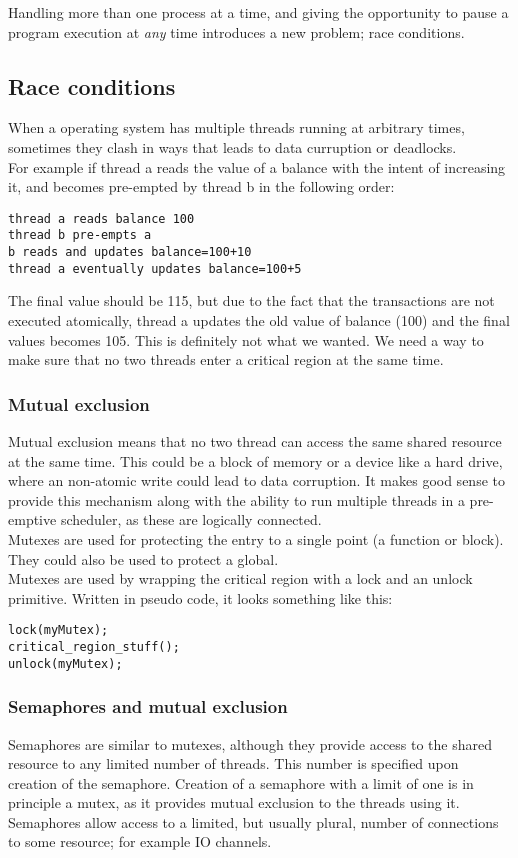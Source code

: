 Handling more than one process at a time, and giving the opportunity to pause a program execution at \emph{any} time introduces a new problem; race conditions.\\
\subsection{Race conditions}
When a operating system has multiple threads running at arbitrary times, sometimes they clash in ways that leads to data curruption or deadlocks.\\
For example if thread a reads the value of a balance with the intent of increasing it, and becomes pre-empted by thread b in the following order:
\begin{verbatim}
thread a reads balance 100
thread b pre-empts a
b reads and updates balance=100+10
thread a eventually updates balance=100+5
\end{verbatim}
The final value should be 115, but due to the fact that the transactions are not executed atomically, thread a updates the old value of balance (100) and the final values becomes 105. This is definitely not what we wanted. We need a way to make sure that no two threads enter a critical region at the same time.

\subsubsection{Mutual exclusion}
Mutual exclusion means that no two thread can access the same shared resource at the same time. This could be a block of memory or a device like a hard drive, where an non-atomic write could lead to data corruption. It makes good sense to provide this mechanism along with the ability to run multiple threads in a pre-emptive scheduler, as these are logically connected.\\
Mutexes are used for protecting the entry to a single point (a function or block). They could also be used to protect a global.\\
Mutexes are used by wrapping the critical region with a lock and an unlock primitive. Written in pseudo code, it looks something like this:
\begin{lstlisting}[basicstyle={\small}]
lock(myMutex);
critical_region_stuff();
unlock(myMutex);
\end{lstlisting}
\subsubsection{Semaphores and mutual exclusion}
Semaphores are similar to mutexes, although they provide access to the shared resource to any limited number of threads. This number is specified upon creation of the semaphore. Creation of a semaphore with a limit of one is in principle a mutex, as it provides mutual exclusion to the threads using it.\\  Semaphores allow access to a limited, but usually plural, number of connections to some resource; for example IO channels.


